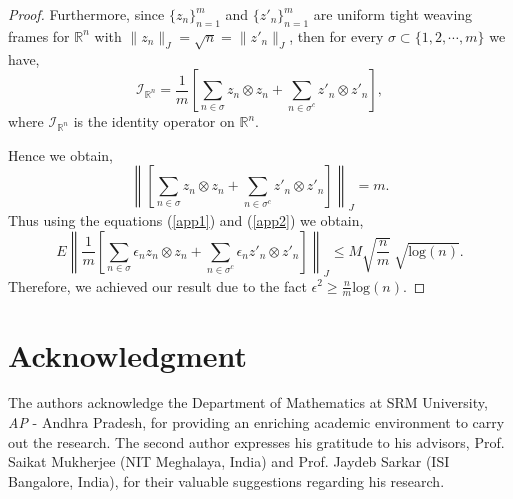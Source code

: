 \documentclass[article,12pt]{amsart}
\begin{document}
\begin{proof}
Furthermore, since $\{z_n\}_{n=1}^m$ and $\{z'_n\}_{n=1}^m$ are uniform tight weaving frames for   $\mathbb R^n$ with $\|z_n\|_{J} = \sqrt n = \|z'_n\|_{J}$, then for every $\sigma \subset \{1, 2, \cdots, m\}$ we have,
\begin{equation*}
\mathcal I_{\mathbb R^n} =  \frac{1}{m} \left [\sum\limits_{n \in \sigma}  z_n \otimes z_n + \sum\limits_{n \in \sigma^c}  z'_n \otimes z'_n \right], 
\end{equation*}
where $\mathcal I_{\mathbb R^n}$ is the identity operator on  $\mathbb R^n$.

Hence we obtain,
\begin{equation}\label{app2}
\left \| \left [\sum\limits_{n \in \sigma} z_n \otimes z_n + \sum\limits_{n \in \sigma^c}  z'_n \otimes z'_n \right] \right \|_{J} =m.
\end{equation}
Thus using the equations (\ref{app1}) and (\ref{app2}) we obtain,
\begin{equation*}
E\left \|  \frac{1}{m} \left [\sum\limits_{n \in \sigma} \epsilon_n z_n \otimes z_n + \sum\limits_{n \in \sigma^c} \epsilon_n  z'_n \otimes z'_n \right] \right \|_{J} \leq M \sqrt{\frac{n}{m}} ~\sqrt {\text{log}(n)}.
\end{equation*}
Therefore, we achieved our result due to the fact $\epsilon^2 \geq \frac{n}{m} \text{log} (n)$.
\end{proof}

 
 

\section*{Acknowledgment}
The authors acknowledge the Department of Mathematics at SRM University, {\it AP} - Andhra Pradesh, for providing an enriching academic environment to carry out the research. The second author expresses his gratitude to his advisors, Prof. Saikat Mukherjee (NIT Meghalaya, India) and Prof. Jaydeb Sarkar (ISI Bangalore, India), for their valuable suggestions regarding his research.

\end{document}
